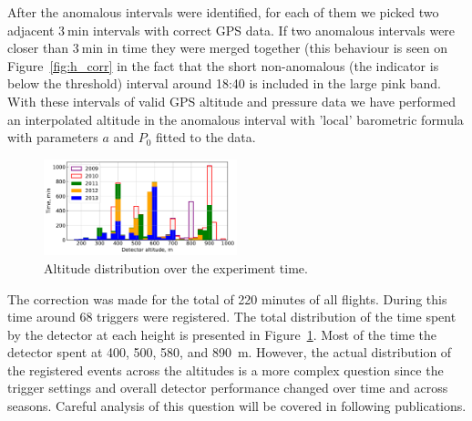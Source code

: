 \documentclass[universe,article,submit,moreauthors,pdftex]{Definitions/mdpi}
\begin{document}
\begin{paracol}{2}
After the anomalous intervals were identified, for each of them we picked two adjacent $3~\textrm{min}$ intervals with correct GPS data. If two anomalous intervals were closer than $3~\textrm{min}$ in time they were merged together (this behaviour is seen on Figure~\ref{fig:h_corr} in the fact that the short non-anomalous (the indicator is below the threshold) interval around 18:40 is included in the large pink band. With these intervals of valid GPS altitude and pressure data we have performed an interpolated altitude in the anomalous interval with 'local' barometric formula with parameters $a$ and $P_0$ fitted to the data.

\begin{figure}[tb]
    \includegraphics[width=0.5\textwidth]{figs/time_on_altitude_c.pdf}%
    \caption{Altitude distribution over the experiment time.}
    \label{fig:time_on_altitude}
\end{figure}

The correction was made for the total of 220 minutes of all flights. During this time around 68 triggers were registered. The total distribution of the time spent by the detector at each height is presented in Figure~\ref{fig:time_on_altitude}. Most of the time the detector spent at 400, 500, 580, and 890~m. However, the actual distribution of the registered events across the altitudes is a more complex question since the trigger settings and overall detector performance changed over time and across seasons. Careful analysis of this question will be covered in following publications.



\end{paracol}
\end{document}
